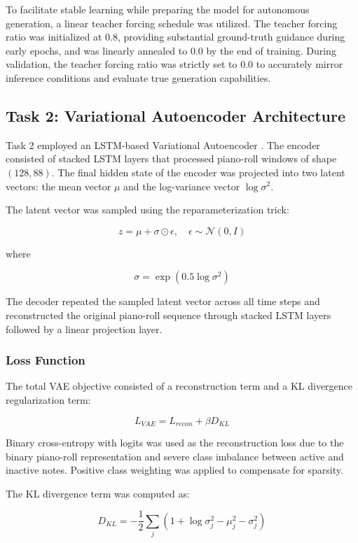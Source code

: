 \documentclass{article}
\theoremstyle{plain}
\theoremstyle{definition}
\theoremstyle{remark}
\begin{document}
To facilitate stable learning while preparing the model for autonomous generation, a linear teacher forcing schedule was utilized. The teacher forcing ratio was initialized at 0.8, providing substantial ground-truth guidance during early epochs, and was linearly annealed to 0.0 by the end of training. During validation, the teacher forcing ratio was strictly set to 0.0 to accurately mirror inference conditions and evaluate true generation capabilities.
\subsection{Task 2: Variational Autoencoder Architecture}

Task 2 employed an LSTM-based Variational Autoencoder \cite{kingma2013vae}. The encoder consisted of stacked LSTM layers that processed piano-roll windows of shape $(128, 88)$. The final hidden state of the encoder was projected into two latent vectors: the mean vector $\mu$ and the log-variance vector $\log \sigma^2$.

The latent vector was sampled using the reparameterization trick:

\[
z = \mu + \sigma \odot \epsilon,
\quad
\epsilon \sim \mathcal{N}(0, I)
\]

where

\[
\sigma = \exp\left(0.5 \log \sigma^2\right)
\]

The decoder repeated the sampled latent vector across all time steps and reconstructed the original piano-roll sequence through stacked LSTM layers followed by a linear projection layer.

\subsubsection{Loss Function}

The total VAE objective consisted of a reconstruction term and a KL divergence regularization term:

\[
L_{VAE} = L_{recon} + \beta D_{KL}
\]

Binary cross-entropy with logits was used as the reconstruction loss due to the binary piano-roll representation and severe class imbalance between active and inactive notes. Positive class weighting was applied to compensate for sparsity.

The KL divergence term was computed as:

\[
D_{KL} =
-\frac{1}{2}
\sum_j
\left(
1 + \log \sigma_j^2
- \mu_j^2
- \sigma_j^2
\right)
\]
\end{document}
